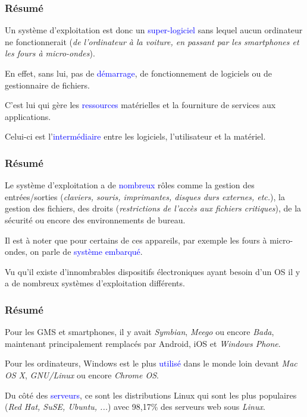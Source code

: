 \documentclass[aspectratio=169]{beamer}
\begin{document}
\begin{frame}
  \frametitle{Résumé}
  Un système d'exploitation est donc un \textcolor{blue}{super-logiciel} sans
  lequel aucun ordinateur ne fonctionnerait (\textit{de l'ordinateur à la
    voiture, en passant par les smartphones et les fours à micro-ondes}).

  \hspace{0.5cm}

  En effet, sans lui, pas de \textcolor{blue}{démarrage}, de fonctionnement de
  logiciels ou de gestionnaire de fichiers.

  \hspace{0.5cm}

  C'est lui qui gère les \textcolor{blue}{ressources} matérielles et la
  fourniture de services aux applications.

  \hspace{0.5cm}

  Celui-ci est l'\textcolor{blue}{intermédiaire} entre les logiciels,
  l'utilisateur et la matériel.
\end{frame}

\begin{frame}
  \frametitle{Résumé}
  Le système d'exploitation a de \textcolor{blue}{nombreux} rôles comme la
  gestion des entrées/sorties (\textit{claviers, souris, imprimantes, disques
    durs externes, etc.}), la gestion des fichiers, des droits
  (\textit{restrictions de l'accès aux fichiers critiques}), de la sécurité ou
  encore des environnements de bureau.

  \hspace{0.5cm}

  Il est à noter que pour certains de ces appareils, par exemple les fours à
  micro-ondes, on parle de \textcolor{blue}{système embarqué}.

  \hspace{0.5cm}

  Vu qu'il existe d'innombrables dispositifs électroniques ayant besoin d'un OS
  il y a de nombreux systèmes d'exploitation différents.
\end{frame}

\begin{frame}
  \frametitle{Résumé}
  Pour les GMS et smartphones, il y avait \textit{Symbian}, \textit{Meego} ou encore \textit{Bada},
  maintenant principalement remplacés par Android, iOS et \textit{Windows Phone}.

  \hspace{0.5cm}

  Pour les ordinateurs, Windows est le plus \textcolor{blue}{utilisé} dans le
  monde loin devant \textit{Mac OS X}, \textit{GNU/Linux} ou encore \textit{Chrome OS}.

  \hspace{0.5cm}

  Du côté des \textcolor{blue}{serveurs}, ce sont les distributions Linux qui
  sont les plus populaires (\textit{Red Hat, SuSE, Ubuntu, ...}) avec 98,17\%
  des serveurs web sous \textit{Linux}.
\end{frame}
\end{document}
